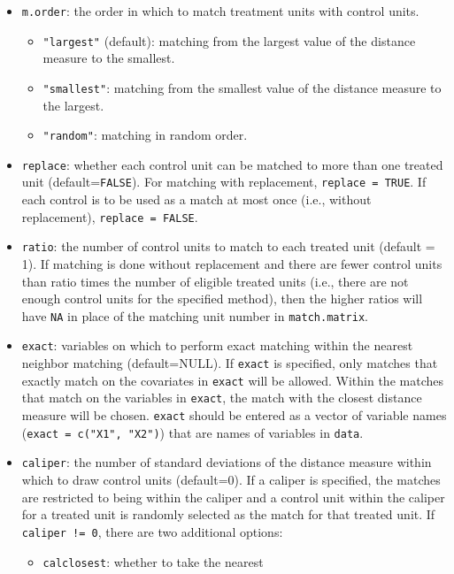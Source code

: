 \begin{itemize}
\item \texttt{m.order}: the order in which to match
  treatment units with control units.
  \begin{itemize}
  \item {\tt "largest"} (default): matching from the largest value of
    the distance measure to the smallest.
  \item {\tt "smallest"}: matching from the smallest value of the
    distance measure to the largest.
  \item {\tt "random"}: matching in random order.
  \end{itemize}
\item \texttt{replace}: whether each control unit can be matched to
  more than one treated unit (default=\texttt{FALSE}).  For matching
  with replacement, \texttt{replace = TRUE}.  If each control is to be
  used as a match at most once (i.e., without replacement),
  \texttt{replace = FALSE}.
\item \texttt{ratio}: the number of control units to match to each
  treated unit (default = 1).  If matching is done without replacement
  and there are fewer control units than ratio times the number of
  eligible treated units (i.e., there are not enough control units for
  the specified method), then the higher ratios will have \texttt{NA}
  in place of the matching unit number in \texttt{match.matrix}.
\item \texttt{exact}: variables on which to perform exact matching
  within the nearest neighbor matching (default=NULL).  If
  \texttt{exact} is specified, only matches that exactly match on the
  covariates in \texttt{exact} will be allowed.  Within the matches
  that match on the variables in \texttt{exact}, the match with the
  closest distance measure will be chosen.  \texttt{exact} should be
  entered as a vector of variable names (\texttt{exact = c("X1",
    "X2")}) that are names of variables in \texttt{data}.
\item \texttt{caliper}: the number of standard deviations of the
  distance measure within which to draw control units (default=0).  If
  a caliper is specified, the matches are restricted to being within
  the caliper and a control unit within the caliper for a treated unit
  is randomly selected as the match for that treated unit.  If
  \texttt{caliper != 0}, there are two additional options:
  \begin{itemize} 
  \item \texttt{calclosest}: whether to take the nearest

\end{itemize}
\end{itemize}
